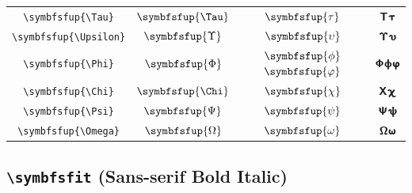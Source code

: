 \documentclass[12pt,a4paper]{article}
\begin{document}
\begin{longtable}{|c|c|c|c|}
\verb|\symbfsfup{\Tau}| & $\symbfsfup{\Tau}$ & $\symbfsfup{\tau}$ & $ 𝝩 𝞃 $ \\
\verb|\symbfsfup{\Upsilon}| & $\symbfsfup{\Upsilon}$ & $\symbfsfup{\upsilon}$ & $ 𝝪 𝞄 $ \\
\verb|\symbfsfup{\Phi}| & $\symbfsfup{\Phi}$ & $\symbfsfup{\phi}$ $\symbfsfup{\varphi}$ & $ 𝝫 𝞍 𝞅 $ \\
\verb|\symbfsfup{\Chi}| & $\symbfsfup{\Chi}$ & $\symbfsfup{\chi}$ & $ 𝝬 𝞆 $ \\
\verb|\symbfsfup{\Psi}| & $\symbfsfup{\Psi}$ & $\symbfsfup{\psi}$ & $ 𝝭 𝞇 $ \\
\verb|\symbfsfup{\Omega}| & $\symbfsfup{\Omega}$ & $\symbfsfup{\omega}$ & $ 𝝮 𝞈 $ \\
\hline
\end{longtable}

\newpage

\subsection*{\texttt{\textbackslash{}symbfsfit} (Sans-serif Bold Italic)}
\end{document}
